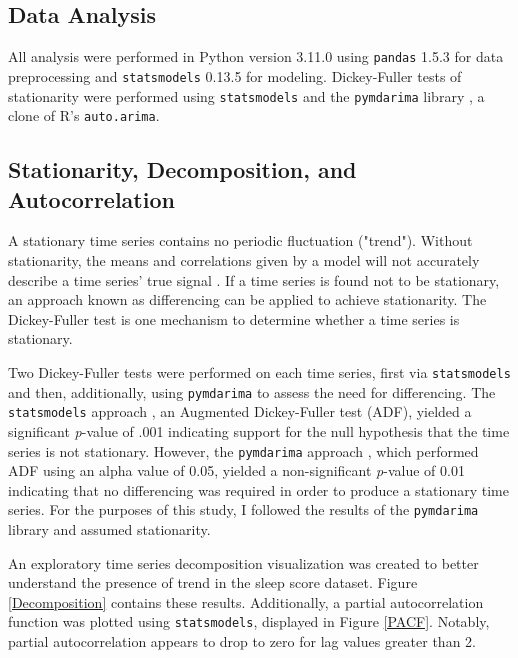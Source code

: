 \documentclass{article}
\begin{document}
\hypertarget{data-analysis}{%
\subsection{Data Analysis}\label{data-analysis}}

All analysis were performed in Python version 3.11.0 \citep{Python} using
\texttt{pandas} 1.5.3 \citep{reback2020pandas} for data preprocessing and
\texttt{statsmodels} 0.13.5 \citep{seabold2010statsmodels} for modeling.
Dickey-Fuller tests of stationarity were performed using \texttt{statsmodels}
and the \texttt{pymdarima} library \citep{pmdarima}, a clone of R's
\texttt{auto.arima}.

\hypertarget{stationarity-decomposition-and-autocorrelation}{%
\subsection{Stationarity, Decomposition, and
Autocorrelation}\label{stationarity-decomposition-and-autocorrelation}}

A stationary time series contains no periodic fluctuation ("trend"). Without
stationarity, the means and correlations given by a model will not accurately
describe a time series' true signal \citep{boseVector2017}. If a time series is
found not to be stationary, an approach known as differencing can be applied to
achieve stationarity. The Dickey-Fuller test is one mechanism to determine
whether a time series is stationary.

Two Dickey-Fuller tests were performed on each time series, first via
\texttt{statsmodels} and then, additionally, using \texttt{pymdarima} to assess
the need for differencing. The \texttt{statsmodels} approach
\citet{seabold2020statsmodels}, an Augmented Dickey-Fuller test (ADF), yielded a
significant \textit{p}-value of .001 indicating support for the null hypothesis
that the time series is not stationary. However, the \texttt{pymdarima} approach
\citet{pymdarima}, which performed ADF using an alpha value of 0.05, yielded a
non-significant \textit{p}-value of 0.01 indicating that no differencing was
required in order to produce a stationary time series. For the purposes of this
study, I followed the results of the \texttt{pymdarima} library and assumed
stationarity.

An exploratory time series decomposition visualization was created to better
understand the presence of trend in the sleep score dataset. Figure
\ref{Decomposition} contains these results. Additionally, a partial
autocorrelation function was plotted using \texttt{statsmodels}, displayed in
Figure \ref{PACF}. Notably, partial autocorrelation appears to drop to zero for
lag values greater than 2.
\end{document}
